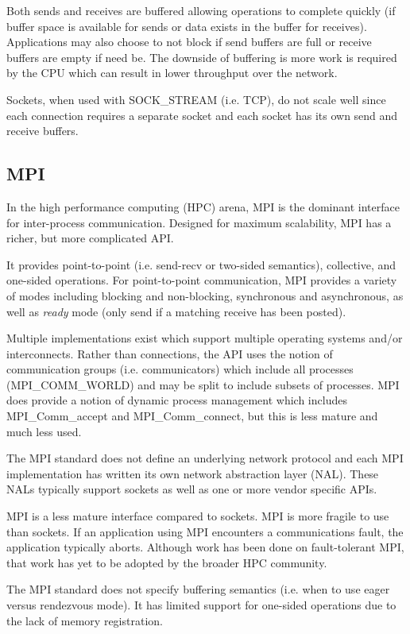 \documentclass[conference]{IEEEtran}
\begin{document}
Both sends and receives are buffered allowing operations to complete quickly (if buffer
space is available for sends or data exists in the buffer for receives). Applications may
also choose to not block if send buffers are full or receive buffers are empty if need be.
The downside of buffering is more work is required by the CPU which can result in lower
throughput over the network.

Sockets, when used with SOCK\_STREAM (i.e. TCP), do not scale well since each connection
requires a separate socket and each socket has its own send and receive buffers.

\subsection{MPI} In the high performance computing (HPC) arena, MPI is the dominant
interface for inter-process communication. Designed for maximum scalability, MPI has a
richer, but more complicated API.

It provides point-to-point (i.e. send-recv or two-sided semantics), collective, and
one-sided operations. For point-to-point communication, MPI provides a variety of modes
including blocking and non-blocking, synchronous and asynchronous, as well as \emph{ready}
mode (only send if a matching receive has been posted).

Multiple implementations exist\cite{ompi, mpich2, mvapich, intel-mpi, platform-mpi}
which support multiple operating systems and/or interconnects.  Rather than connections,
the API uses the notion of communication groups (i.e.  communicators) which include all
processes (MPI\_COMM\_WORLD) and may be split to include subsets of processes. MPI does
provide a notion of dynamic process management which includes MPI\_Comm\_accept and
MPI\_Comm\_connect, but this is less mature and much less used.

The MPI standard does not define an underlying network protocol and each MPI
implementation has written its own network abstraction layer (NAL). These NALs typically
support sockets as well as one or more vendor specific APIs.

MPI is a less mature interface compared to sockets. MPI is more fragile to use than
sockets. If an application using MPI encounters a communications fault, the application
typically aborts. Although work has been done on fault-tolerant MPI\cite{ft-mpi, mpi-ft},
that work has yet to be adopted by the broader HPC community.

The MPI standard does not specify buffering semantics (i.e. when to use eager versus
rendezvous mode). It has limited support for one-sided operations due to the lack of
memory registration.
\end{document}

